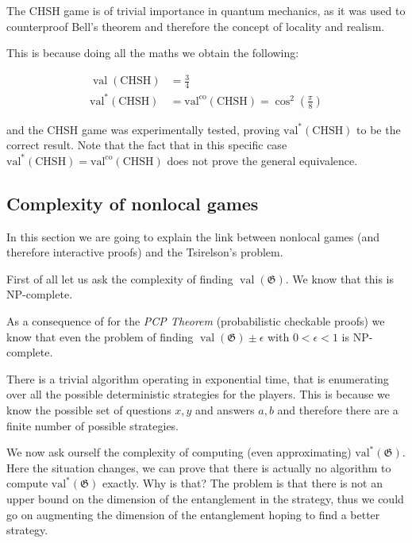 The CHSH game is of trivial importance in quantum mechanics, as it was used to counterproof Bell's theorem and therefore the concept of locality and realism.


This is because  doing all the maths we obtain the following:

 \begin{align}
    \operatorname{val}(\text{CHSH}) &= \frac{3}{4} \\
    \operatorname{val^{*}}(\text{CHSH}) &= \operatorname{val^{co}}(\text{CHSH}) = \cos^2\left(\frac{\pi}{8}\right) 
 \end{align}

 and the CHSH game was experimentally tested, proving $\operatorname{val^{*}}(\text{CHSH})$ to be the correct result.
Note that the fact that in this specific case $\operatorname{val^{*}}(\text{CHSH}) = \operatorname{val^{co}}(\text{CHSH}) $  does not prove the general equivalence.

\subsection{Complexity of nonlocal games}
In this section we are going to explain the link between nonlocal games (and therefore interactive proofs) and the Tsirelson's problem.

First of all let us ask the complexity of finding $\operatorname{val}(\mathfrak{G})$. 
We know that this is NP-complete. 

As a consequence of for the \emph{PCP Theorem} (probabilistic checkable proofs) we know that even the problem of finding $\operatorname{val}(\mathfrak{G}) \pm \epsilon$ with $ 0 < \epsilon < 1$ is NP-complete.

There is a trivial algorithm operating in exponential time, that is enumerating over all the possible deterministic strategies for the players. This is because we know the possible set of questions $x,y$ and answers $a,b$ and therefore there are a finite number of possible strategies.

We now ask ourself the complexity of computing (even approximating) $\operatorname{val^{*}}(\mathfrak{G})$. Here the situation changes, we can prove that there is actually no algorithm to compute $\operatorname{val^{*}}(\mathfrak{G})$ exactly. Why is that? The problem is that there is not an upper bound on the dimension of the entanglement in the strategy, thus we could go on augmenting the dimension of the entanglement hoping to find a better strategy.



